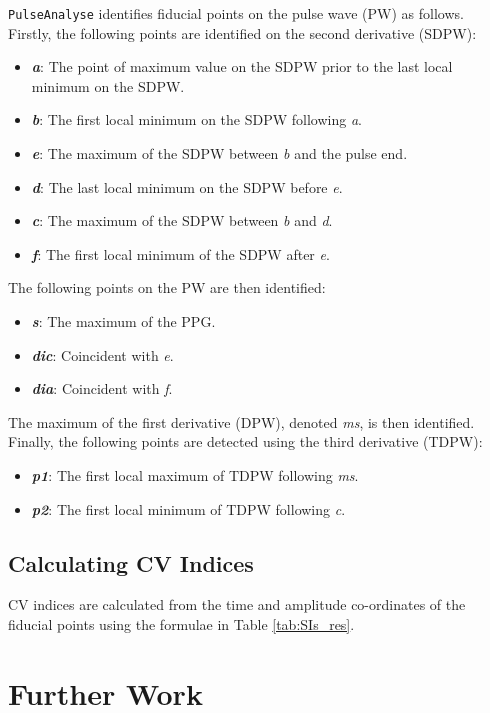 \documentclass[12pt]{iopart}
\newcommand{\pa}{\texttt{PulseAnalyse}}
\begin{document}
\pa{} identifies fiducial points on the pulse wave (PW) as follows. Firstly, the following points are identified on the second derivative (SDPW):
\begin{itemize}
	\item \textbf{\emph{a}}: The point of maximum value on the SDPW prior to the last local minimum on the SDPW.
	\item \textbf{\emph{b}}: The first local minimum on the SDPW following \emph{a}.
	\item \textbf{\emph{e}}: The maximum of the SDPW between \emph{b} and the pulse end.
	\item \textbf{\emph{d}}: The last local minimum on the SDPW before \emph{e}.
	\item \textbf{\emph{c}}: The maximum of the SDPW between \emph{b} and \emph{d}.
	\item \textbf{\emph{f}}: The first local minimum of the SDPW after \emph{e}.
\end{itemize}
The following points on the PW are then identified:
\begin{itemize}
	\item \textbf{\emph{s}}: The maximum of the PPG.
	\item \textbf{\emph{dic}}: Coincident with \emph{e}.
	\item \textbf{\emph{dia}}: Coincident with \emph{f}.
\end{itemize}
The maximum of the first derivative (DPW), denoted \emph{ms}, is then identified. Finally, the following points are detected using the third derivative (TDPW):
\begin{itemize}
	\item \textbf{\emph{p1}}: The first local maximum of TDPW following \emph{ms}.
	\item \textbf{\emph{p2}}: The first local minimum of TDPW following \emph{c}.
\end{itemize}

\subsection{Calculating CV Indices}

CV indices are calculated from the time and amplitude co-ordinates of the fiducial points using the formulae in Table \ref{tab:SIs_res}.

\section{Further Work}
\label{sec:prev_work}
\end{document}

